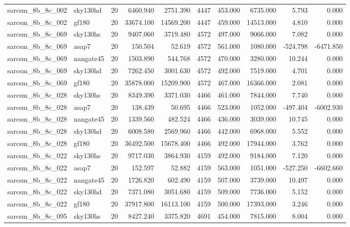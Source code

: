 \begin{tabular}{llrrrrrrrr}
sarcsm\_8b\_8c\_002 & sky130hd & 20 & 6460.940 & 2751.390 & 4447 & 453.000 & 6735.000 & 5.793 & 0.000 \\
sarcsm\_8b\_8c\_002 & gf180 & 20 & 33674.100 & 14569.200 & 4447 & 459.000 & 14513.000 & 4.810 & 0.000 \\
sarcsm\_8b\_8c\_069 & sky130hs & 20 & 9407.060 & 3719.480 & 4572 & 497.000 & 9066.000 & 7.082 & 0.000 \\
sarcsm\_8b\_8c\_069 & asap7 & 20 & 150.504 & 52.619 & 4572 & 561.000 & 1080.000 & -524.798 & -6471.850 \\
sarcsm\_8b\_8c\_069 & nangate45 & 20 & 1503.890 & 544.768 & 4572 & 470.000 & 3280.000 & 10.244 & 0.000 \\
sarcsm\_8b\_8c\_069 & sky130hd & 20 & 7262.450 & 3001.630 & 4572 & 492.000 & 7519.000 & 4.701 & 0.000 \\
sarcsm\_8b\_8c\_069 & gf180 & 20 & 35878.000 & 15209.900 & 4572 & 467.000 & 16366.000 & 2.081 & 0.000 \\
sarcsm\_8b\_8c\_028 & sky130hs & 20 & 8349.390 & 3371.030 & 4466 & 461.000 & 7844.000 & 7.740 & 0.000 \\
sarcsm\_8b\_8c\_028 & asap7 & 20 & 138.439 & 50.695 & 4466 & 523.000 & 1052.000 & -497.404 & -6002.930 \\
sarcsm\_8b\_8c\_028 & nangate45 & 20 & 1339.560 & 482.524 & 4466 & 436.000 & 3039.000 & 10.745 & 0.000 \\
sarcsm\_8b\_8c\_028 & sky130hd & 20 & 6008.580 & 2569.960 & 4466 & 442.000 & 6968.000 & 5.552 & 0.000 \\
sarcsm\_8b\_8c\_028 & gf180 & 20 & 36492.500 & 15678.400 & 4466 & 492.000 & 17944.000 & 3.762 & 0.000 \\
sarcsm\_8b\_8c\_022 & sky130hs & 20 & 9717.030 & 3864.930 & 4159 & 492.000 & 9184.000 & 7.120 & 0.000 \\
sarcsm\_8b\_8c\_022 & asap7 & 20 & 152.597 & 52.882 & 4159 & 563.000 & 1051.000 & -527.250 & -6602.660 \\
sarcsm\_8b\_8c\_022 & nangate45 & 20 & 1726.820 & 602.490 & 4159 & 507.000 & 3739.000 & 10.497 & 0.000 \\
sarcsm\_8b\_8c\_022 & sky130hd & 20 & 7371.080 & 3051.680 & 4159 & 509.000 & 7736.000 & 5.152 & 0.000 \\
sarcsm\_8b\_8c\_022 & gf180 & 20 & 37917.800 & 16113.100 & 4159 & 500.000 & 17393.000 & 3.246 & 0.000 \\
sarcsm\_8b\_8c\_095 & sky130hs & 20 & 8427.240 & 3375.820 & 4691 & 454.000 & 7815.000 & 8.004 & 0.000 \\

\end{tabular}
